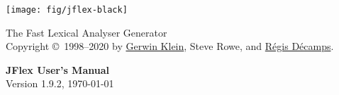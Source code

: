 \documentclass[11pt]{scrartcl}
\begin{document}
\centerline{\texttt{[image: fig/jflex-black]}}

\begin{center}
\sffamily
{\Large The Fast Lexical Analyser Generator}\\
\smallskip\smallskip
Copyright \copyright\ 1998--2020 by \href{http://www.doclsf.de}{Gerwin Klein},
Steve Rowe, and \href{http://regis.decamps.info/}{R\'egis D\'ecamps}.

\vspace*{15ex}
{\Huge \sffamily \bfseries JFlex User's Manual}\\
\bigskip
Version 1.9.2, {\today}
\end{center}

\newpage
\tableofcontents
\newpage













\newpage



\end{document}

